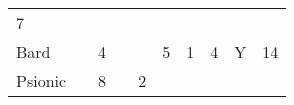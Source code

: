 \documentclass[12pt]{article}
\begin{document}
\begin{longtable}[]{@{}llllllllll@{}}
\begin{minipage}[t]{0.08\columnwidth}\raggedright\strut
7
\strut\end{minipage}\tabularnewline
\begin{minipage}[t]{0.13\columnwidth}\raggedright\strut
Bard
\strut\end{minipage} &
\begin{minipage}[t]{0.06\columnwidth}\raggedright\strut
\strut\end{minipage} &
\begin{minipage}[t]{0.06\columnwidth}\raggedright\strut
4
\strut\end{minipage} &
\begin{minipage}[t]{0.06\columnwidth}\raggedright\strut
\strut\end{minipage} &
\begin{minipage}[t]{0.06\columnwidth}\raggedright\strut
\strut\end{minipage} &
\begin{minipage}[t]{0.06\columnwidth}\raggedright\strut
5
\strut\end{minipage} &
\begin{minipage}[t]{0.06\columnwidth}\raggedright\strut
1
\strut\end{minipage} &
\begin{minipage}[t]{0.06\columnwidth}\raggedright\strut
4
\strut\end{minipage} &
\begin{minipage}[t]{0.07\columnwidth}\raggedright\strut
Y
\strut\end{minipage} &
\begin{minipage}[t]{0.08\columnwidth}\raggedright\strut
14
\strut\end{minipage}\tabularnewline
\begin{minipage}[t]{0.13\columnwidth}\raggedright\strut
Psionic
\strut\end{minipage} &
\begin{minipage}[t]{0.06\columnwidth}\raggedright\strut
\strut\end{minipage} &
\begin{minipage}[t]{0.06\columnwidth}\raggedright\strut
8
\strut\end{minipage} &
\begin{minipage}[t]{0.06\columnwidth}\raggedright\strut
\strut\end{minipage} &
\begin{minipage}[t]{0.06\columnwidth}\raggedright\strut
2
\strut\end{minipage} &

\end{longtable}
\end{document}
